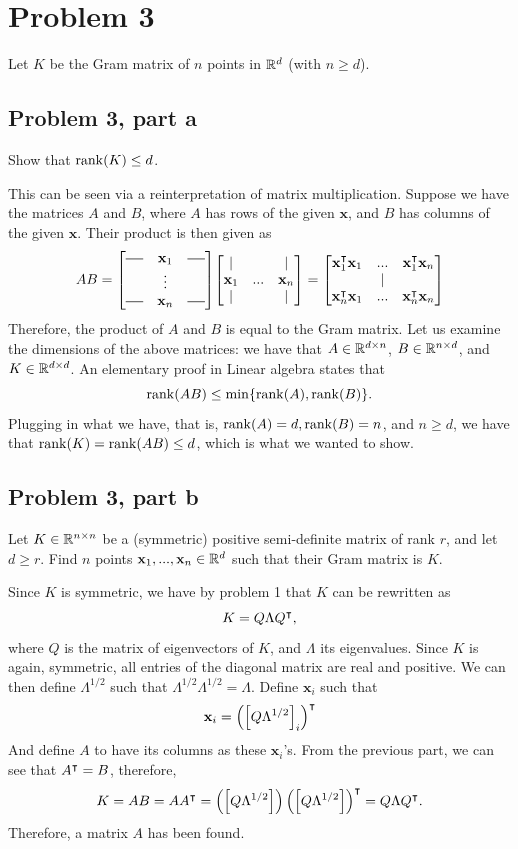 \newpage
\section{Problem 3}
Let $K$ be the Gram matrix of $n$ points in $\mathbb{R}^d$ (with $n \geq d$).
\newcommand{\hpipe}{\rule[0.5ex]{1.25em}{0.5pt}}
\subsection{Problem 3, part a}
Show that $\rank(K) \leq d$.
\partbreak
\begin{solution}

    This can be seen via a reinterpretation of matrix multiplication. Suppose we have the matrices $A$ and $B$, where $A$ has rows of the given $\textbf{x}$, and $B$ has columns of the given $\textbf{x}$. Their product is then given as
    \[AB = \mqty[\hpipe&\textbf{x}_1&\hpipe\\&\vdots&\\\hpipe&\textbf{x}_n&\hpipe]\mqty[|&&|\\\textbf{x}_1&...&\textbf{x}_n\\|&&|] = \mqty[\textbf{x}_1\T \textbf{x}_1 &...&\textbf{x}_1\T \textbf{x}_n\\&|&\\\textbf{x}_n\T\textbf{x}_1 &...&\textbf{x}_n\T \textbf{x}_n]\]
    Therefore, the product of $A$ and $B$ is equal to the Gram matrix. Let us examine the dimensions of the above matrices: we have that $A \in \mathbb{R}^{d \times n}$, $B \in \mathbb{R}^{n \times d}$, and $K \in \mathbb{R}^{d \times d}$. An elementary proof in Linear algebra states that 
    \[\rank(AB) \leq \min\{\rank(A), \rank(B)\}.\]
    Plugging in what we have, that is, $\rank(A) = d, \rank(B) = n$, and $n \geq d$, we have that $\rank(K) = \rank(AB) \leq d$, which is what we wanted to show.  
\end{solution}


\newpage
\subsection{Problem 3, part b}
Let $K \in \mathbb{R}^{n\times n}$ be a (symmetric) positive semi-definite matrix of rank $r$, and let $d \geq r$. Find $n$ points $\textbf{x}_1, ..., \textbf{x}_n \in \mathbb{R}^d$ such that their Gram matrix is $K$. 
\partbreak
\begin{solution}

    Since $K$ is symmetric, we have by problem 1 that $K$ can be rewritten as 
    \[K = Q\Lambda Q^{\intercal},\]
    where $Q$ is the matrix of eigenvectors of $K$, and $\Lambda$ its eigenvalues. Since $K$ is again, symmetric, all entries of the diagonal matrix are real and positive. We can then define $\Lambda^{1/2}$ such that $\Lambda^{1/2}\Lambda^{1/2} = \Lambda$. Define $\textbf{x}_i$ such that
    \[\textbf{x}_i = \left(\left[ Q\Lambda^{1/2}\right]_{i}\right)^{\intercal}\]
    And define $A$ to have its columns as these $\textbf{x}_i$'s. From the previous part, we can see that $A^{\intercal} = B$, therefore, 
    \[K = A B = A A^{\intercal} = \left(\left[ Q\Lambda^{1/2}\right]\right)\left(\left[ Q\Lambda^{1/2}\right]\right)^{\intercal} = Q\Lambda Q^{\intercal}.\]
    Therefore, a matrix $A$ has been found. 
\end{solution}
\newcommand{\1}{\mathbbm{1}}

